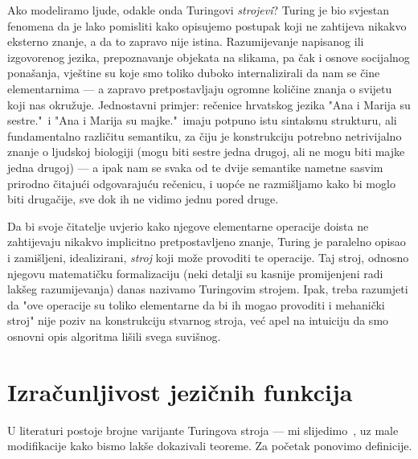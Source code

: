 Ako modeliramo ljude, odakle onda Turingovi \emph{strojevi}? Turing je bio svjestan fenomena da je lako pomisliti kako opisujemo postupak koji ne zahtijeva nikakvo eksterno znanje, a da to zapravo nije istina. Razumijevanje napisanog ili izgovorenog jezika, prepoznavanje objekata na slikama, pa čak i osnove socijalnog ponašanja, vještine su koje smo toliko duboko internalizirali da nam se čine elementarnima --- a zapravo pretpostavljaju ogromne količine znanja o svijetu koji nas okružuje. Jednostavni primjer: rečenice hrvatskog jezika "Ana i Marija su sestre."\ i "Ana i Marija su majke."\ imaju potpuno istu sintaksnu strukturu, ali fundamentalno različitu semantiku, za čiju je konstrukciju potrebno netrivijalno znanje o ljudskoj biologiji (mogu biti sestre jedna drugoj, ali ne mogu biti majke jedna drugoj) --- a ipak nam se svaka od te dvije semantike nametne sasvim prirodno čitajući odgovarajuću rečenicu, i uopće ne razmišljamo kako bi moglo biti drugačije, sve dok ih ne vidimo jednu pored druge.

Da bi svoje čitatelje uvjerio kako njegove elementarne operacije doista ne zahtijevaju nikakvo implicitno pretpostavljeno znanje, Turing je paralelno opisao i zamišljeni, idealizirani, \emph{stroj} koji može provoditi te operacije. Taj stroj, odnosno njegovu matematičku formalizaciju (neki detalji su kasnije promijenjeni radi lakšeg razumijevanja) danas nazivamo Turingovim strojem. Ipak, treba razumjeti da "ove operacije su toliko elementarne da bi ih mogao provoditi i mehanički stroj" nije poziv na konstrukciju stvarnog stroja, već apel na intuiciju da smo osnovni opis algoritma lišili svega suvišnog.

\section{Izračunljivost jezičnih funkcija}\label{sec:tikp}

U literaturi postoje brojne varijante Turingova stroja --- mi slijedimo~\cite{sipser}, uz male modifikacije kako bismo lakše dokazivali teoreme. Za početak ponovimo definicije.

